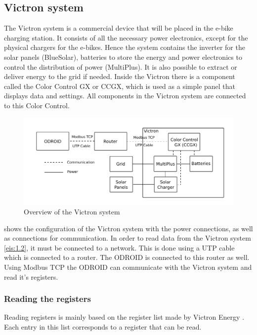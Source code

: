 \subsection{Victron system}\label{sec:Victron}
The Victron system is a commercial device that will be placed in the e-bike charging station. It consists of all the necessary power electronics, except for the physical chargers for the e-bikes. Hence the system contains the inverter for the solar panels (BlueSolar), batteries to store the energy and power electronics to control the distribution of power (MultiPlus). It is also possible to extract or deliver energy to the grid if needed. Inside the Victron there is a component called the Color Control GX \cite{GXPanel} or CCGX, which is used as a simple panel that displays data and settings. All components in the Victron system are connected to this Color Control. 

\begin{figure}[!ht]
  \centering
    \includegraphics[width=1.0\textwidth]{images/victron.pdf}
      \caption{Overview of the Victron system}\label{fig:victron}
\end{figure}

 shows the configuration of the Victron system with the power connections, as well as connections for communication. In order to read data from the Victron system \ref{eis:1.2}, it must be connected to a network. This is done using a UTP cable which is connected to a router. The ODROID is connected to this router as well. Using Modbus TCP the ODROID can communicate with the Victron system and read it's registers.

\subsubsection{Reading the registers}
Reading registers is mainly based on the register list made by Victron Energy \cite{excel_registers}. Each entry in this list corresponds to a register that can be read.

